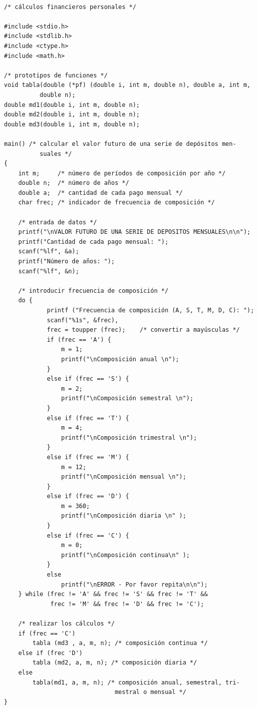 \documentclass{article}
\begin{document}
\begin{verbatim}

/* cálculos financieros personales */

#include <stdio.h>
#include <stdlib.h>
#include <ctype.h>
#include <math.h>

/* prototipos de funciones */
void tabla(double (*pf) (double i, int m, double n), double a, int m,
          double n);
double md1(double i, int m, double n);
double md2(double i, int m, double n);
double md3(double i, int m, double n);

main() /* calcular el valor futuro de una serie de depósitos men-
          suales */
{
    int m;     /* número de períodos de composición por año */
    double n;  /* número de años */
    double a;  /* cantidad de cada pago mensual */
    char frec; /* indicador de frecuencia de composición */
    
    /* entrada de datos */
    printf("\nVALOR FUTURO DE UNA SERIE DE DEPOSITOS MENSUALES\n\n");
    printf("Cantidad de cada pago mensual: ");
    scanf("%lf", &a);
    printf("Número de años: ");
    scanf("%lf", &n);

    /* introducir frecuencia de composición */
    do {
            printf ("Frecuencia de composición (A, S, T, M, D, C): ");
            scanf("%1s", &frec),
            frec = toupper (frec);    /* convertir a mayúsculas */
            if (frec == 'A') { 
                m = 1; 
                printf("\nComposición anual \n"); 
            }
            else if (frec == 'S') { 
                m = 2; 
                printf("\nComposición semestral \n");
            }
            else if (frec == 'T') { 
                m = 4; 
                printf("\nComposición trimestral \n");
            }
            else if (frec == 'M') { 
                m = 12; 
                printf("\nComposición mensual \n"); 
            }
            else if (frec == 'D') { 
                m = 360; 
                printf("\nComposición diaria \n" );
            }
            else if (frec == 'C') { 
                m = 0; 
                printf("\nComposición continua\n" );
            }
            else 
                printf("\nERROR - Por favor repita\n\n");
    } while (frec != 'A' && frec != 'S' && frec != 'T' && 
             frec != 'M' && frec != 'D' && frec != 'C');

    /* realizar los cálculos */
    if (frec == 'C') 
        tabla (md3 , a, m, n); /* composición continua */
    else if (frec 'D') 
        tabla (md2, a, m, n); /* composición diaria */
    else 
        tabla(md1, a, m, n); /* composición anual, semestral, tri-
                               mestral o mensual */
}


\end{verbatim}
\end{document}
